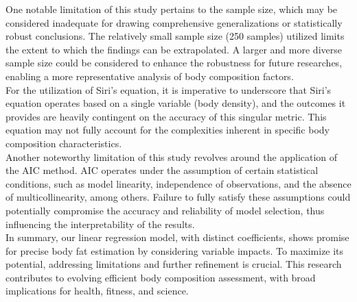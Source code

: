 \documentclass[letterpaper,9pt,twocolumn,twoside,]{pinp}
\begin{document}
One notable limitation of this study pertains to the sample size, which
may be considered inadequate for drawing comprehensive generalizations
or statistically robust conclusions. The relatively small sample size
(250 samples) utilized limits the extent to which the findings can be
extrapolated. A larger and more diverse sample size could be considered
to enhance the robustness for future researches, enabling a more
representative analysis of body composition factors.\\
For the utilization of Siri's equation, it is imperative to underscore
that Siri's equation operates based on a single variable (body density),
and the outcomes it provides are heavily contingent on the accuracy of
this singular metric. This equation may not fully account for the
complexities inherent in specific body composition characteristics.\\
Another noteworthy limitation of this study revolves around the
application of the AIC method. AIC operates under the assumption of
certain statistical conditions, such as model linearity, independence of
observations, and the absence of multicollinearity, among others.
Failure to fully satisfy these assumptions could potentially compromise
the accuracy and reliability of model selection, thus influencing the
interpretability of the results.\\
In summary, our linear regression model, with distinct coefficients,
shows promise for precise body fat estimation by considering variable
impacts. To maximize its potential, addressing limitations and further
refinement is crucial. This research contributes to evolving efficient
body composition assessment, with broad implications for health,
fitness, and science.





\end{document}

